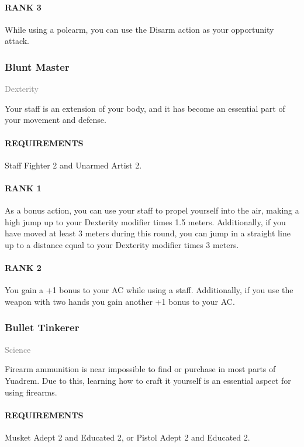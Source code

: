 \paragraph{RANK 3} While using a polearm, you can use the Disarm action as your opportunity attack.

\subsubsection{Blunt Master} \label{feat::bluntmaster}
\small{\textcolor{gray}{Dexterity}}

\normalsize
Your staff is an extension of your body, and it has become an essential part of your movement and defense.
\paragraph{REQUIREMENTS} Staff Fighter 2 and Unarmed Artist 2.
\paragraph{RANK 1} As a bonus action, you can use your staff to propel yourself into the air, making a high jump up to your Dexterity modifier times 1.5 meters.
Additionally, if you have moved at least 3 meters during this round, you can jump in a straight line up to a distance equal to your Dexterity modifier times 3 meters.
\paragraph{RANK 2} You gain a +1 bonus to your AC while using a staff.
Additionally, if you use the weapon with two hands you gain another +1 bonus to your AC.

\subsubsection{Bullet Tinkerer} \label{feat::bullettinkerer}
\small{\textcolor{gray}{Science}}

\normalsize
Firearm ammunition is near impossible to find or purchase in most parts of Yuadrem.
Due to this, learning how to craft it yourself is an essential aspect for using firearms.
\paragraph{REQUIREMENTS} Musket Adept 2 and Educated 2, or Pistol Adept 2 and Educated 2.
